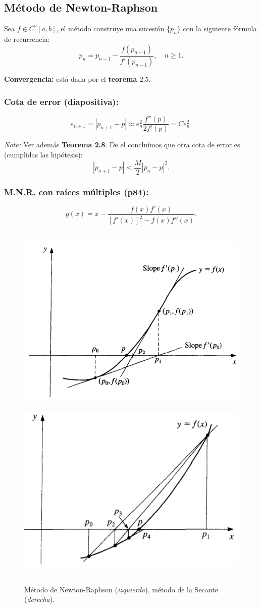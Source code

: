 \documentclass[10pt,a4paper]{article}
\begin{document}
\subsection{Método de Newton-Raphson}

Sea $f \in C^2 [a,b]$, el método construye una sucesión $\{p_n\}$ con la siguiente fórmula de recurrencia:
\[p_n = p_{n-1} - \frac{f(p_{n-1})}{f'(p_{n-1})},\quad n\geq 1.\]

\textbf{Convergencia:} está dada por el \textbf{teorema $2.5$}.

\subsubsection{Cota de error (diapositiva):}
\[e_{n+1}=|p_{n+1}-p| \approx e_n^2\frac{f''(p)}{2f'(p)} = C e_n^2.\]

\textit{Nota:} Ver además \textbf{Teorema 2.8}. De el concluímos que otra cota de error es (cumplidas las hipótesis):
\[|p_{n+1}-p| < \frac{M}{2}|p_n - p|^2.\]

\subsubsection{M.N.R. con raíces múltiples (p84):}
\[g(x)=x-\frac{f(x) f'(x)}{[f'(x)]^2 -f(x) f''(x)}.\]

\begin{figure}[h!]
  \label{fig:newton}
  \caption{Método de Newton-Raphson (\textit{izquierda}), método de la Secante (\textit{derecha}).}
  \centering
  \hbox{
  \includegraphics[width=0.45\textwidth-\fboxrule-\fboxrule]{img/newton.png}
  \hspace{0.04\textwidth-\fboxrule-\fboxrule}
   \includegraphics[width=0.45\textwidth-\fboxrule-\fboxrule]{img/secant.png}
    }
\end{figure}	
\end{document}
